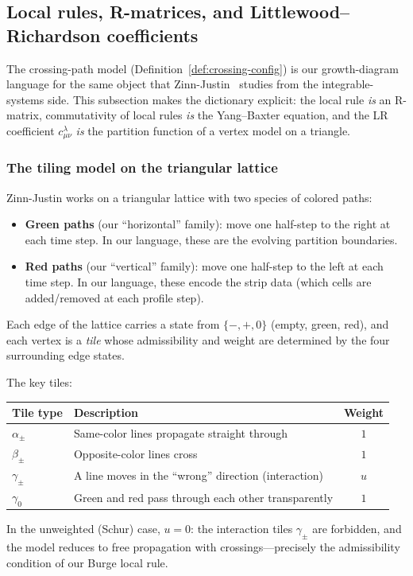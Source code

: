 \documentclass[11pt]{article}
\theoremstyle{plain}
\theoremstyle{definition}
\theoremstyle{remark}
\begin{document}
\subsection{Local rules, R-matrices, and Littlewood--Richardson coefficients}
\label{sec:local-rules-R-matrix}


The crossing-path model (Definition~\ref{def:crossing-config})
is our growth-diagram language for the same object that
Zinn-Justin~\cite{zinn-justin-2009} studies from the
integrable-systems side.  This subsection makes the dictionary
explicit: the local rule \emph{is} an R-matrix, commutativity
of local rules \emph{is} the Yang--Baxter equation, and the
LR coefficient $c^\lambda_{\mu\nu}$ \emph{is} the partition
function of a vertex model on a triangle.

\subsubsection*{The tiling model on the triangular lattice}

Zinn-Justin works on a triangular lattice with two species of
colored paths:
\begin{itemize}
\item \textbf{Green paths} (our ``horizontal'' family):
  move one half-step to the right at each time step.
  In our language, these are the evolving partition boundaries.
\item \textbf{Red paths} (our ``vertical'' family):
  move one half-step to the left at each time step.
  In our language, these encode the strip data (which cells
  are added/removed at each profile step).
\end{itemize}
Each edge of the lattice carries a state from
$\{-, +, 0\}$ (empty, green, red), and each vertex is a
\emph{tile} whose admissibility and weight are determined by
the four surrounding edge states.

The key tiles:
\begin{center}
\renewcommand{\arraystretch}{1.3}
\begin{tabular}{l|l|c}
  \textbf{Tile type} & \textbf{Description} & \textbf{Weight} \\
  \hline
  $\alpha_\pm$ & Same-color lines propagate straight through & $1$ \\
  $\beta_\pm$ & Opposite-color lines cross & $1$ \\
  $\gamma_\pm$ & A line moves in the ``wrong'' direction
    (interaction) & $u$ \\
  $\gamma_0$ & Green and red pass through each other
    transparently & $1$
\end{tabular}
\end{center}
In the unweighted (Schur) case, $u = 0$: the interaction tiles
$\gamma_\pm$ are forbidden, and the model reduces to free
propagation with crossings---precisely the admissibility
condition of our Burge local rule.
\end{document}
